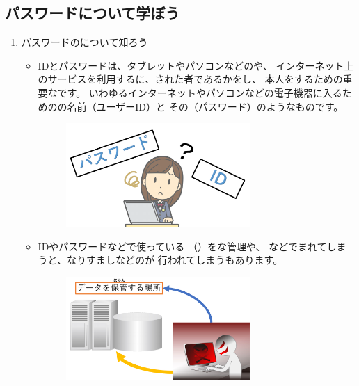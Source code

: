 % 
% 
\subsection{パスワードについて学ぼう}

\begin{enumerate}
  \item パスワードのについて知ろう
  \begin{itemize}
    \item IDとパスワードは、タブレットやパソコンなどのや、
    インターネット上のサービスを利用するに、された者であるかをし、
    本人をするための重要なです。
    いわゆるインターネットやパソコンなどの電子機器に入るためのの名前（ユーザーID）と
    その（パスワード）のようなものです。
    \begin{figure}[h]
      \centering
      \includegraphics[width=7.000cm]{text01-img/pswd_image_imp6.pdf}
    \end{figure}

    \item IDやパスワードなどで使っている
    （）をな管理や、
    などでまれてしまうと、なりすましなどのが
    行われてしまうもあります。
    \begin{figure}[h]
      \centering
      \includegraphics[width=7.000cm]{text01-img/pswd_image_imp5.pdf}
    \end{figure}


\end{itemize}
\end{enumerate}
